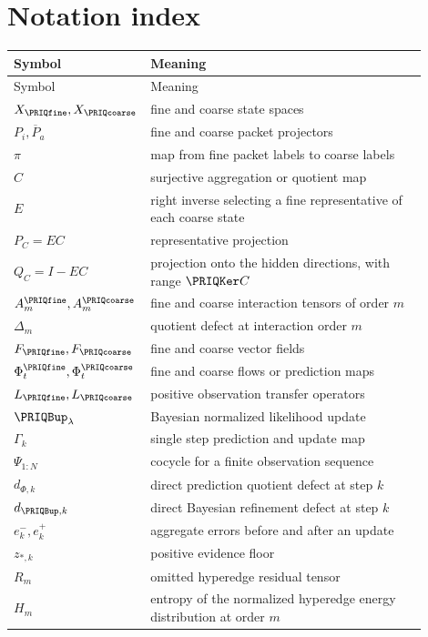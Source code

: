 \documentclass[11pt,oneside,openany]{book}
\numberwithin{equation}{section}
\begin{document}
\section{Notation index}\label{PRIQ:app:notation}
\begin{longtable}{@{}p{0.22\linewidth}p{0.68\linewidth}@{}}
\toprule
Symbol & Meaning\\
\midrule
\endfirsthead
\toprule
Symbol & Meaning\\
\midrule
\endhead
$X_{\PRIQfine},X_{\PRIQcoarse}$ & fine and coarse state spaces\\
$P_i,\overline P_a$ & fine and coarse packet projectors\\
$\pi$ & map from fine packet labels to coarse labels\\
$C$ & surjective aggregation or quotient map\\
$E$ & right inverse selecting a fine representative of each coarse state\\
$P_C=EC$ & representative projection\\
$Q_C=I-EC$ & projection onto the hidden directions, with range $\PRIQKer C$\\
$A_m^{\PRIQfine},A_m^{\PRIQcoarse}$ & fine and coarse interaction tensors of order $m$\\
$\Delta_m$ & quotient defect at interaction order $m$\\
$F_{\PRIQfine},F_{\PRIQcoarse}$ & fine and coarse vector fields\\
$\Phi_t^{\PRIQfine},\Phi_t^{\PRIQcoarse}$ & fine and coarse flows or prediction maps\\
$L_{\PRIQfine},L_{\PRIQcoarse}$ & positive observation transfer operators\\
$\PRIQBup_{\lambda}$ & Bayesian normalized likelihood update\\
$\Gamma_k$ & single step prediction and update map\\
$\Psi_{1:N}$ & cocycle for a finite observation sequence\\
$d_{\Phi,k}$ & direct prediction quotient defect at step $k$\\
$d_{\PRIQBup,k}$ & direct Bayesian refinement defect at step $k$\\
$e_k^-,e_k^+$ & aggregate errors before and after an update\\
$z_{*,k}$ & positive evidence floor\\
$R_m$ & omitted hyperedge residual tensor\\
$H_m$ & entropy of the normalized hyperedge energy distribution at order $m$\\
\bottomrule
\end{longtable}
\end{document}
